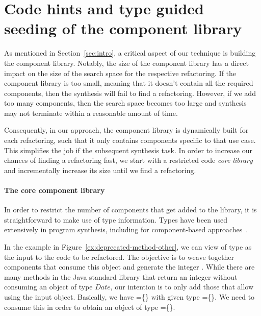 \documentclass[runningheads,a4paper]{llncs}
\begin{document}
\section{{\bf Code hints and type guided seeding of the component library}}\label{sec:components-seeding}
As mentioned in Section~\ref{sec:intro}, a critical aspect of our technique is building the
component library. 
Notably, the size of the component library has a direct impact
on the size of the search space for the respective refactoring.
If the component library is too small, meaning that it doesn't contain all
the required components, then the synthesis will fail to find a refactoring.
However, if we add too many components, then the search space becomes too large and
synthesis may not terminate within a reasonable amount of time.

Consequently, in our approach, the component library is dynamically built for each refactoring,
such that it only contains components specific to that use case.
This simplifies the job if the subsequent synthesis task.
In order to increase our chances of finding a refactoring fast, we start with a restricted code  {\em core library} and incrementally increase its size
until we find a refactoring.


\paragraph{The core component library}

In order to restrict the number of components that get added to the library,
it is straightforward to make use of type information.
Types have been used extensively in program synthesis, including for
component-based approaches~\cite{}.

In the example in Figure~\ref{ex:deprecated-method-other}, we can view  of type  as the input to the code to be refactored. The objective is to weave together components that consume this object and generate the integer . While there are many methods in the Java standard library that return an integer without consuming an object of type $Date$, our intention is to only add those that allow using the input object. Basically, we have  
=\{\} with given type =\{\}. We need to consume this in order to obtain an object of type =\{\}.
\end{document}
